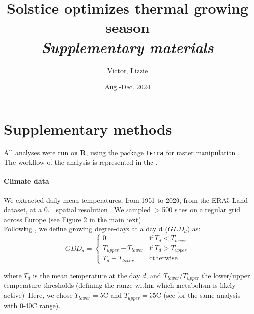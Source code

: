 \documentclass[11pt,letter]{article}
\title{Solstice optimizes thermal growing season\\\emph{Supplementary materials}}
\author{Victor, Lizzie}
\date{Aug.-Dec. 2024}
\begin{document}
\maketitle

\section*{Supplementary methods} %

All analyses were run on \textbf{\textsf{R}}, using the package \texttt{terra} for raster manipulation \citep{Hijmans2024}. The workflow of the analysis is represented in the .

\paragraph{Climate data}
We extracted daily mean temperatures, from 1951 to 2020, from the ERA5-Land dataset, at a 0.1\degree~spatial resolution \citep{MunozSabater2021}. We sampled $>$500 sites on a regular grid across Europe (see Figure 2 in the main text).\\
Following \citet{McMaster1997}, we define growing degree-days at a day d ($GDD_d$) as:
\begin{equation}
GDD_d =
\begin{cases}
    0 & \text{if}~T_d<T_{lower}\\
    T_{upper}-T_{lower} & \text{if}~T_d>T_{upper}\\
    T_d-T_{lower} & \text{otherwise}
\end{cases}       
\end{equation}

\noindent where $T_d$ is the mean temperature at the day $d$, and $T_{lower}$/$T_{upper}$ the lower/upper temperature thresholds (defining the range within which metabolism is likely active). Here, we chose $T_{lower}=5$\degree C and $T_{upper}=35$\degree C (see  for the same analysis with 0-40\degree C range). 
\end{document}
